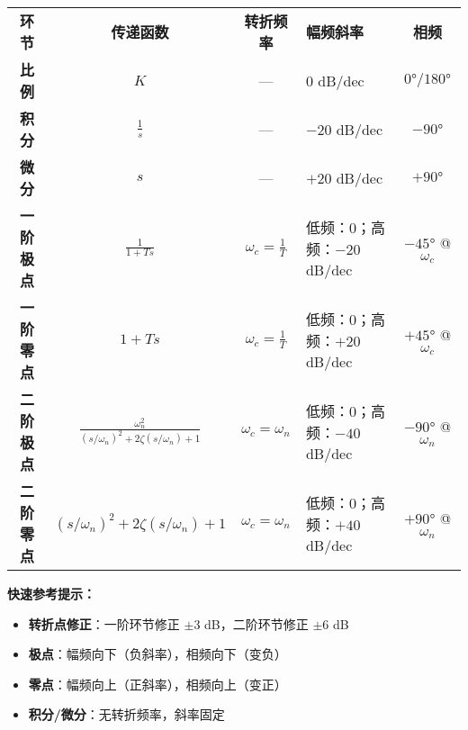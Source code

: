 {\renewcommand{\arraystretch}{2.0}
\small
\begin{center}
\begin{tabular}{|c|c|c|p{4.8cm}|c|}
\hline
\rowcolor{blue!30}
\multicolumn{5}{|c|}{\Large\textbf{伯德图典型环节速查表}} \\
\hline
\rowcolor{blue!15}
\textbf{环节} & \textbf{传递函数} & \textbf{转折频率} & \textbf{幅频斜率} & \textbf{相频} \\
\hline

\rowcolor{gray!8}
\textbf{比例} & $K$ & — & $0$ dB/dec & $0°/180°$ \\
\hline

\rowcolor{white}
\textbf{积分} & $\frac{1}{s}$ & — & $-20$ dB/dec & $-90°$ \\
\hline

\rowcolor{gray!8}
\textbf{微分} & $s$ & — & $+20$ dB/dec & $+90°$ \\
\hline

\rowcolor{white}
\textbf{一阶极点} & $\frac{1}{1+Ts}$ & $\omega_c = \frac{1}{T}$ & 
低频：$0$；高频：$-20$ dB/dec & 
$-45°$ @ $\omega_c$ \\
\hline

\rowcolor{gray!8}
\textbf{一阶零点} & $1+Ts$ & $\omega_c = \frac{1}{T}$ & 
低频：$0$；高频：$+20$ dB/dec & 
$+45°$ @ $\omega_c$ \\
\hline

\rowcolor{white}
\textbf{二阶极点} & $\frac{\omega_n^2}{(s/\omega_n)^2+2\zeta(s/\omega_n)+1}$ & $\omega_c = \omega_n$ & 
低频：$0$；高频：$-40$ dB/dec & 
$-90°$ @ $\omega_n$ \\
\hline

\rowcolor{gray!8}
\textbf{二阶零点} & $(s/\omega_n)^2+2\zeta(s/\omega_n)+1$ & $\omega_c = \omega_n$ & 
低频：$0$；高频：$+40$ dB/dec & 
$+90°$ @ $\omega_n$ \\
\hline

\end{tabular}
\end{center}
}

\textbf{快速参考提示：}
\begin{itemize}
    \item \textbf{转折点修正}：一阶环节修正 $\pm 3$ dB，二阶环节修正 $\pm 6$ dB
    \item \textbf{极点}：幅频向下（负斜率），相频向下（变负）
    \item \textbf{零点}：幅频向上（正斜率），相频向上（变正）
    \item \textbf{积分/微分}：无转折频率，斜率固定
\end{itemize}

